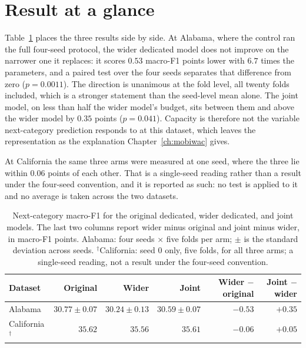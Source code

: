 \section{Result at a glance}
\label{sec:apx-parameter-summary}

Table~\ref{tab:apx-parameter-comparison} places the three results side by side. At Alabama, where
the control ran the full four-seed protocol, the wider dedicated model does not improve on the
narrower one it replaces: it scores $0.53$ macro-F1 points lower with $6.7$ times the parameters,
and a paired test over the four seeds separates that difference from zero ($p = 0.0011$). The
direction is unanimous at the fold level, all twenty folds included, which is a stronger statement
than the seed-level mean alone. The joint
model, on less than half the wider model's budget, sits between them and above the wider
model by $0.35$ points ($p = 0.041$). Capacity is therefore not the variable next-category
prediction responds to at this dataset, which leaves the representation as the explanation
Chapter~\ref{ch:mobiwac} gives.

At California the same three arms were measured at one seed, where the three lie within $0.06$
points of each other. That is a single-seed reading rather than a result under the four-seed
convention, and it is reported as such: no test is applied to it and no average is taken across the
two datasets.

\begin{table}[H]
    \centering
    \caption{Next-category macro-F1 for the original dedicated, wider dedicated,
    and joint models. The last two columns report wider minus original and joint
    minus wider, in macro-F1 points. Alabama: four seeds $\times$ five folds per arm;
    $\pm$ is the standard deviation across seeds. $^{\dagger}$California: seed 0 only,
    five folds, for all three arms; a single-seed reading, not a result under the
    four-seed convention.}
    \label{tab:apx-parameter-comparison}
    {\small
    \setlength{\tabcolsep}{4pt}
    \begin{tabular}{lrrrrr}
        \toprule
        Dataset & Original & Wider & Joint & Wider $-$ original & Joint $-$ wider \\
        \midrule
        Alabama                  & $30.77 \pm 0.07$ & $30.24 \pm 0.13$ & $30.59 \pm 0.07$ & $-0.53$ & $+0.35$ \\
        California$^{\dagger}$   & $35.62$           & $35.56$           & $35.61$           & $-0.06$ & $+0.05$ \\
        \bottomrule
    \end{tabular}
    }
\end{table}

